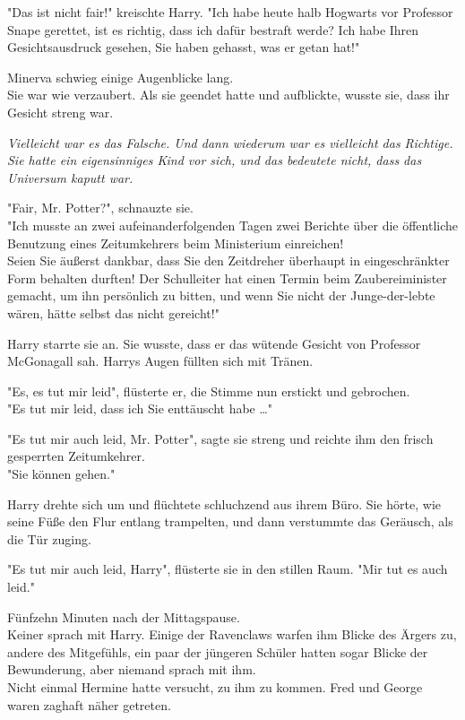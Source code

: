 {"Das ist nicht fair!" kreischte Harry. "Ich habe heute halb Hogwarts vor Professor Snape gerettet, ist es richtig, dass ich dafür bestraft werde? Ich habe Ihren Gesichtsausdruck gesehen, Sie haben gehasst, was er getan hat!"

Minerva schwieg einige Augenblicke lang.\\ Sie war wie verzaubert. Als sie geendet hatte und aufblickte, wusste sie, dass ihr Gesicht streng war.

\emph{Vielleicht war es das Falsche. Und dann wiederum war es vielleicht das Richtige. Sie hatte ein eigensinniges Kind vor sich, und das bedeutete nicht, dass das Universum kaputt war.}

"Fair, Mr. Potter?", schnauzte sie.\\ "Ich musste an zwei aufeinanderfolgenden Tagen zwei Berichte über die öffentliche Benutzung eines Zeitumkehrers beim Ministerium einreichen!\\ Seien Sie äußerst dankbar, dass Sie den Zeitdreher überhaupt in eingeschränkter Form behalten durften! Der Schulleiter hat einen Termin beim Zaubereiminister gemacht, um ihn persönlich zu bitten, und wenn Sie nicht der Junge-der-lebte wären, hätte selbst das nicht gereicht!"

Harry starrte sie an. Sie wusste, dass er das wütende Gesicht von Professor McGonagall sah. Harrys Augen füllten sich mit Tränen.

"Es, es tut mir leid", flüsterte er, die Stimme nun erstickt und gebrochen.\\ "Es tut mir leid, dass ich Sie enttäuscht habe …"

"Es tut mir auch leid, Mr. Potter", sagte sie streng und reichte ihm den frisch gesperrten Zeitumkehrer.\\ "Sie können gehen."

Harry drehte sich um und flüchtete schluchzend aus ihrem Büro. Sie hörte, wie seine Füße den Flur entlang trampelten, und dann verstummte das Geräusch, als die Tür zuging.

"Es tut mir auch leid, Harry", flüsterte sie in den stillen Raum. "Mir tut es auch leid."

Fünfzehn Minuten nach der Mittagspause.\\ Keiner sprach mit Harry. Einige der Ravenclaws warfen ihm Blicke des Ärgers zu, andere des Mitgefühls, ein paar der jüngeren Schüler hatten sogar Blicke der Bewunderung, aber niemand sprach mit ihm.\\ Nicht einmal Hermine hatte versucht, zu ihm zu kommen. Fred und George waren zaghaft näher getreten.

}

